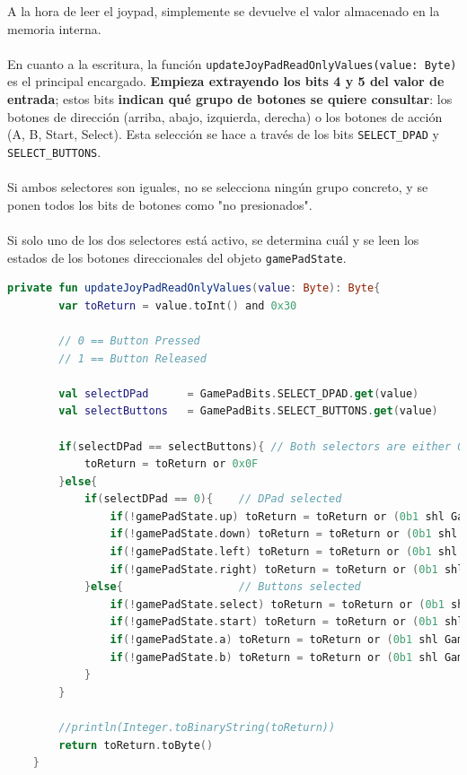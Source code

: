 A la hora de leer el joypad, simplemente se devuelve el valor almacenado en la memoria interna.
\\\\
En cuanto a la escritura, la función \texttt{updateJoyPadReadOnlyValues(value: Byte)} es el principal encargado. \textbf{Empieza extrayendo los bits 4 y 5 del valor de entrada}; estos bits \textbf{indican qué grupo de botones se quiere consultar}: los botones de dirección (arriba, abajo, izquierda, derecha) o los botones de acción (A, B, Start, Select). Esta selección se hace a través de los bits \texttt{SELECT\_DPAD} y \texttt{SELECT\_BUTTONS}.
\\\\
Si ambos selectores son iguales, no se selecciona ningún grupo concreto, y se ponen todos los bits de botones como "no presionados".
\\\\
Si solo uno de los dos selectores está activo, se determina cuál y se leen los estados de los botones direccionales del objeto \texttt{gamePadState}.

\begin{lstlisting}[language=Kotlin, caption={Escritura de los Estados de los Botones del Joypad}, label={code:iojoypadwrite}]
    private fun updateJoyPadReadOnlyValues(value: Byte): Byte{
        var toReturn = value.toInt() and 0x30

        // 0 == Button Pressed
        // 1 == Button Released

        val selectDPad      = GamePadBits.SELECT_DPAD.get(value)
        val selectButtons   = GamePadBits.SELECT_BUTTONS.get(value)

        if(selectDPad == selectButtons){ // Both selectors are either 0 or 1
            toReturn = toReturn or 0x0F
        }else{
            if(selectDPad == 0){    // DPad selected
                if(!gamePadState.up) toReturn = toReturn or (0b1 shl GamePadBits.UP_PAD.bit)
                if(!gamePadState.down) toReturn = toReturn or (0b1 shl GamePadBits.DOWN_PAD.bit)
                if(!gamePadState.left) toReturn = toReturn or (0b1 shl GamePadBits.LEFT_PAD.bit)
                if(!gamePadState.right) toReturn = toReturn or (0b1 shl GamePadBits.RIGHT_PAD.bit)
            }else{                  // Buttons selected
                if(!gamePadState.select) toReturn = toReturn or (0b1 shl GamePadBits.SELECT_BUTTON.bit)
                if(!gamePadState.start) toReturn = toReturn or (0b1 shl GamePadBits.START_BUTTON.bit)
                if(!gamePadState.a) toReturn = toReturn or (0b1 shl GamePadBits.A_BUTTON.bit)
                if(!gamePadState.b) toReturn = toReturn or (0b1 shl GamePadBits.B_BUTTON.bit)
            }
        }

        //println(Integer.toBinaryString(toReturn))
        return toReturn.toByte()
    }
\end{lstlisting}

